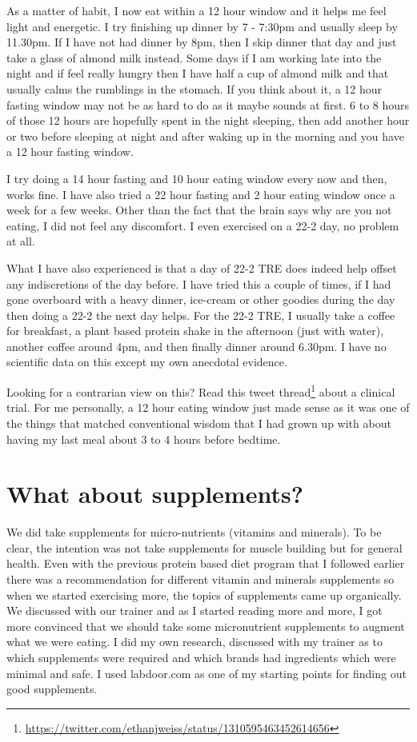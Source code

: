 \documentclass[
  oneside]{book}
\DeclareRobustCommand{\href}[2]{#2\footnote{\url{#1}}}
\begin{document}
As a matter of habit, I now eat within a 12 hour window and it helps me feel light and energetic. I try finishing up dinner by 7 - 7:30pm and usually sleep by 11.30pm. If I have not had dinner by 8pm, then I skip dinner that day and just take a glass of almond milk instead. Some days if I am working late into the night and if feel really hungry then I have half a cup of almond milk and that usually calms the rumblings in the stomach. If you think about it, a 12 hour fasting window may not be as hard to do as it maybe sounds at first. 6 to 8 hours of those 12 hours are hopefully spent in the night sleeping, then add another hour or two before sleeping at night and after waking up in the morning and you have a 12 hour fasting window.

I try doing a 14 hour fasting and 10 hour eating window every now and then, works fine. I have also tried a 22 hour fasting and 2 hour eating window once a week for a few weeks. Other than the fact that the brain says why are you not eating, I did not feel any discomfort. I even exercised on a 22-2 day, no problem at all.

What I have also experienced is that a day of 22-2 TRE does indeed help offset any indiscretions of the day before. I have tried this a couple of times, if I had gone overboard with a heavy dinner, ice-cream or other goodies during the day then doing a 22-2 the next day helps. For the 22-2 TRE, I usually take a coffee for breakfast, a plant based protein shake in the afternoon (just with water), another coffee around 4pm, and then finally dinner around 6.30pm. I have no scientific data on this except my own anecdotal evidence.

Looking for a contrarian view on this? Read this \href{https://twitter.com/ethanjweiss/status/1310595463452614656}{tweet thread} about a clinical trial. For me personally, a 12 hour eating window just made sense as it was one of the things that matched conventional wisdom that I had grown up with about having my last meal about 3 to 4 hours before bedtime.

\hypertarget{what-about-supplements}{%
\section{What about supplements?}\label{what-about-supplements}}

We did take supplements for micro-nutrients (vitamins and minerals). To be clear, the intention was not take supplements for muscle building but for general health. Even with the previous protein based diet program that I followed earlier there was a recommendation for different vitamin and minerals supplements so when we started exercising more, the topics of supplements came up organically. We discussed with our trainer and as I started reading more and more, I got more convinced that we should take some micronutrient supplements to augment what we were eating. I did my own research, discussed with my trainer as to which supplements were required and which brands had ingredients which were minimal and safe. I used labdoor.com as one of my starting points for finding out good supplements.
\end{document}
